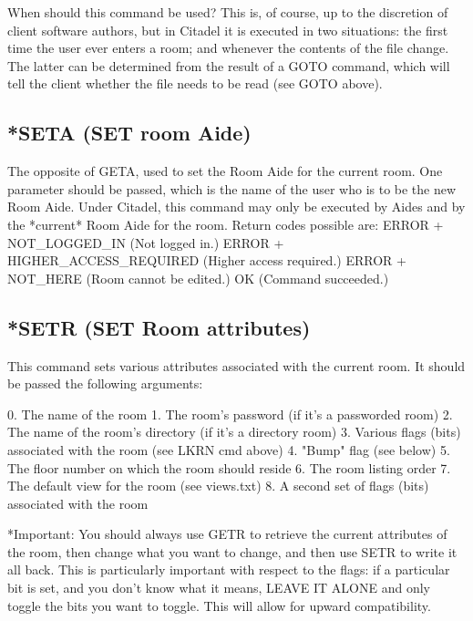  When should this command be used?  This is, of course, up to the discretion
of client software authors, but in Citadel it is executed in two situations:
the first time the user ever enters a room; and whenever the contents of the
file change.  The latter can be determined from the result of a GOTO command,
which will tell the client whether the file needs to be read (see GOTO above).



\subsection{*SETA (SET room Aide)}

 The opposite of GETA, used to set the Room Aide for the current room.  One
parameter should be passed, which is the name of the user who is to be the
new Room Aide.  Under Citadel, this command may only be executed by Aides
and by the *current* Room Aide for the room.  Return codes possible are:
 ERROR + NOT_LOGGED_IN          (Not logged in.)
 ERROR + HIGHER_ACCESS_REQUIRED (Higher access required.)
 ERROR + NOT_HERE               (Room cannot be edited.)
 OK                             (Command succeeded.)



\subsection{*SETR (SET Room attributes)}

 This command sets various attributes associated with the current room.  It
should be passed the following arguments:

 0. The name of the room
 1. The room's password (if it's a passworded room)
 2. The name of the room's directory (if it's a directory room)
 3. Various flags (bits) associated with the room (see LKRN cmd above)
 4. "Bump" flag (see below)
 5. The floor number on which the room should reside
 6. The room listing order
 7. The default view for the room (see views.txt)
 8. A second set of flags (bits) associated with the room

 *Important: You should always use GETR to retrieve the current attributes of
the room, then change what you want to change, and then use SETR to write it
all back.  This is particularly important with respect to the flags: if a
particular bit is set, and you don't know what it means, LEAVE IT ALONE and
only toggle the bits you want to toggle.  This will allow for upward
compatibility.


